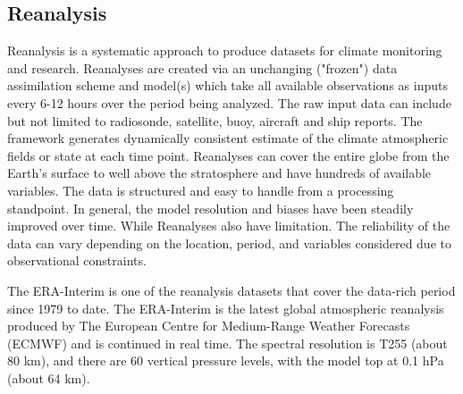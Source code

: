 \subsection{Reanalysis}
Reanalysis is a systematic approach to produce datasets for climate monitoring and research\cite{Reanalysis}. Reanalyses are created via an unchanging ("frozen") data assimilation scheme and model(s) which take all available observations as inputs every 6-12 hours over the period being analyzed. The raw input data can include but not limited to radiosonde, satellite, buoy, aircraft and ship reports. The framework generates dynamically consistent estimate of the climate atmospheric fields or state at each time point. Reanalyses can cover the entire globe from the Earth’s surface to well above the stratosphere and have hundreds of available variables. The data is structured and easy to handle from a processing standpoint. In general, the model resolution and biases have been steadily improved over time. While Reanalyses also have limitation. The reliability of the data can vary depending on the location, period, and variables considered due to observational constraints. 

The ERA-Interim is one of the reanalysis datasets that cover the data-rich period since 1979 to date. The ERA-Interim is the latest global atmospheric reanalysis produced by The European Centre for Medium-Range Weather Forecasts (ECMWF) and is continued in real time. The spectral resolution is T255 (about 80 km), and there are 60 vertical pressure levels, with the model top at 0.1 hPa (about 64 km). 


